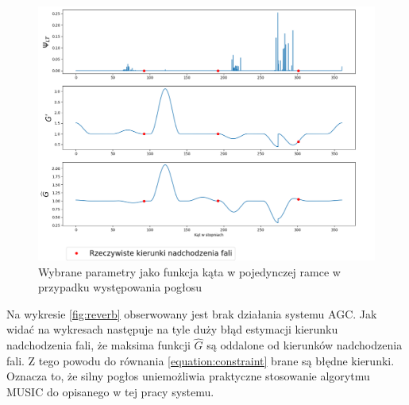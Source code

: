 \begin{figure}[h!]
    \centering
    \includegraphics[width=\textwidth]{Images/reverb_params_in_angle.png}
    \caption{Wybrane parametry jako funkcja kąta w pojedynczej ramce w przypadku występowania pogłosu}
    \label{fig:reverb_params_in_angle}
\end{figure}

\noindent Na wykresie \ref{fig:reverb} obserwowany jest brak działania systemu AGC. Jak widać na wykresach następuje na tyle duży błąd estymacji kierunku nadchodzenia fali, że maksima funkcji $\widehat{G}$ są oddalone od kierunków nadchodzenia fali. Z tego powodu do równania \eqref{equation:constraint} brane są błędne kierunki. Oznacza to, że silny pogłos uniemożliwia praktyczne stosowanie algorytmu MUSIC do opisanego w tej pracy systemu.













